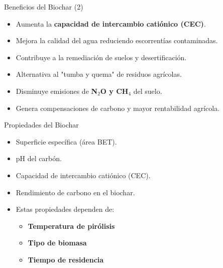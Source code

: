 \documentclass[../../main.tex]{subfiles}
\begin{document}
\begin{frame}{Beneficios del Biochar (2)}
\small
\begin{itemize}
  \item Aumenta la \textbf{capacidad de intercambio catiónico (CEC)}.
  \item Mejora la calidad del agua reduciendo escorrentías contaminadas.
  \item Contribuye a la remediación de suelos y desertificación.
  \item Alternativa al "tumba y quema" de residuos agrícolas.
  \item Disminuye emisiones de \textbf{N$_2$O y CH$_4$} del suelo.
  \item Genera compensaciones de carbono y mayor rentabilidad agrícola.
\end{itemize}
\end{frame}

\begin{frame}{Propiedades del Biochar}
\small
\begin{itemize}
  \item Superficie específica (área BET).
  \item pH del carbón.
  \item Capacidad de intercambio catiónico (CEC).
  \item Rendimiento de carbono en el biochar.
  \item Estas propiedades dependen de:
  \begin{itemize}
    \item \textbf{Temperatura de pirólisis}
    \item \textbf{Tipo de biomasa}
    \item \textbf{Tiempo de residencia}
  \end{itemize}
\end{itemize}
\end{frame}
\end{document}
